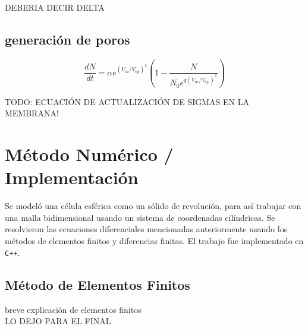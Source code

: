 \documentclass[a4paper,10pt]{article}
\begin{document}
DEBERIA DECIR DELTA
\subsection{generación de poros}
\begin{equation}
	\frac{dN}{dt} = \alpha e^{(V_m/V_{ep})^2} \left( 1 - \frac{N}{N_0 e^{q \left(V_m/V_{ep} \right) ^2}} \right)
\end{equation}



TODO: ECUACIÓN DE ACTUALIZACIÓN DE SIGMAS EN LA MEMBRANA!

\section{Método Numérico / Implementación}


Se modeló una célula esférica como un sólido de revolución, para así trabajar con una malla bidimensional usando un sistema de coordenadas cilíndricas. Se resolvieron las ecuaciones diferenciales mencionadas anteriormente usando los métodos de elementos finitos y diferencias finitas. El trabajo fue implementado en \texttt{C++}.


\subsection{Método de Elementos Finitos}
breve explicación de elementos finitos 
\\LO DEJO PARA EL FINAL

%
%
\end{document}
